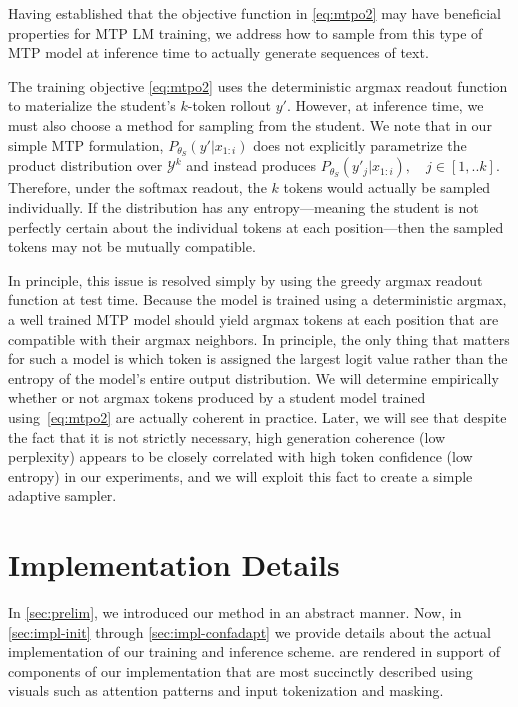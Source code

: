 \documentclass{article}
\theoremstyle{plain}
\theoremstyle{definition}
\theoremstyle{remark}
\begin{document}
Having established that the objective function in \cref{eq:mtpo2} may have beneficial properties for MTP LM training, we address how to sample from this type of MTP model at inference time to actually generate sequences of text. 

The training objective \cref{eq:mtpo2} uses the deterministic argmax readout function to materialize the student's $k$-token rollout $y'$. However, at inference time, we must also choose a method for sampling from the student. We note that in our simple MTP formulation, $P_{\theta_S}(y' | x_{1:i})$ does not explicitly parametrize the product distribution over $\mathcal{Y}^k$ and instead produces $P_{\theta_S}(y'_j | x_{1:i}), \quad j \in [1,..k]$. Therefore, under the softmax readout, the $k$ tokens would actually be sampled individually. If the distribution has any entropy---meaning the student is not perfectly certain about the individual tokens at each position---then the sampled tokens may not be mutually compatible.

In principle, this issue is resolved simply by using the greedy argmax readout function at test time. Because the model is trained using a deterministic argmax, a well trained MTP model should yield argmax tokens at each position that are compatible with their argmax neighbors. 
In principle, the only thing that matters for such a model is which token is assigned the largest logit value rather than the entropy of the model's entire output distribution.
We will determine empirically whether or not argmax tokens produced by a student model trained using~\cref{eq:mtpo2} are actually coherent in practice. Later, we will see that despite the fact that it is not strictly necessary, high generation coherence (low perplexity) appears to be closely correlated with high token confidence (low entropy) in our experiments, and we will exploit this fact to create a simple adaptive sampler.

\section{Implementation Details}\label{sec:impl}

In \cref{sec:prelim}, we introduced our method in an abstract manner. Now, in \cref{sec:impl-init} through \cref{sec:impl-confadapt} we provide details about the actual implementation of our training and inference scheme.  are rendered in support of components of our implementation that are most succinctly described using visuals such as attention patterns and input tokenization and masking.
\end{document}
